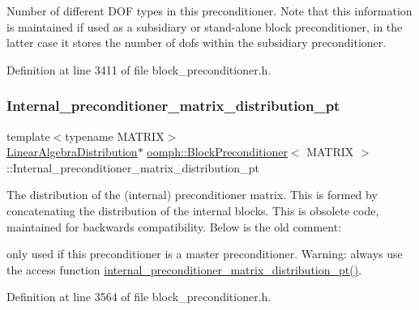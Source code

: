 Number of different D\+OF types in this preconditioner. Note that this information is maintained if used as a subsidiary or stand-\/alone block preconditioner, in the latter case it stores the number of dofs within the subsidiary preconditioner. 



Definition at line 3411 of file block\+\_\+preconditioner.\+h.

\mbox{\label{classoomph_1_1BlockPreconditioner_a58079eb938b4d3602d0819cf68b318c0}} 
\subsubsection{\texorpdfstring{Internal\+\_\+preconditioner\+\_\+matrix\+\_\+distribution\+\_\+pt}{Internal\_preconditioner\_matrix\_distribution\_pt}}
{\footnotesize\ttfamily template$<$typename M\+A\+T\+R\+IX$>$ \\
\hyperlink{classoomph_1_1LinearAlgebraDistribution}{Linear\+Algebra\+Distribution}$\ast$ \hyperlink{classoomph_1_1BlockPreconditioner}{oomph\+::\+Block\+Preconditioner}$<$ M\+A\+T\+R\+IX $>$\+::Internal\+\_\+preconditioner\+\_\+matrix\+\_\+distribution\+\_\+pt\hspace{0.3cm}{\ttfamily [private]}}



The distribution of the (internal) preconditioner matrix. This is formed by concatenating the distribution of the internal blocks. This is obsolete code, maintained for backwards compatibility. Below is the old comment\+: 


\begin{DoxyItemize}
\item only used if this preconditioner is a master preconditioner. Warning\+: always use the access function \hyperlink{classoomph_1_1BlockPreconditioner_a3a16de88bd5369e729d761a6498fdd3f}{internal\+\_\+preconditioner\+\_\+matrix\+\_\+distribution\+\_\+pt()}. 
\end{DoxyItemize}

Definition at line 3564 of file block\+\_\+preconditioner.\+h.

